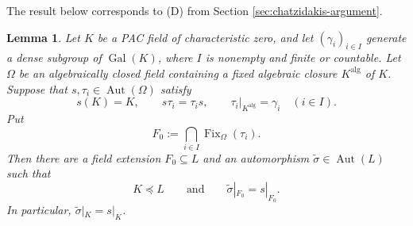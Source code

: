 \documentclass[11pt,a4paper]{amsart}
\newtheorem{lemma}[theorem]{Lemma}
\theoremstyle{definition}
\newcommand{\alg}{\mathrm{alg}}
\DeclareMathOperator{\Gal}{Gal}
\DeclareMathOperator{\Aut}{Aut}
\DeclareMathOperator{\Fix}{Fix}
\begin{document}
The result below corresponds to (D) from Section \ref{sec:chatzidakis-argument}.
\begin{lemma}\label{b:lem:completion}
Let $K$ be a PAC field of characteristic zero, and let
$(\gamma_i)_{i\in I}$ generate a dense subgroup of $\Gal(K)$,
where $I$ is nonempty and finite or countable. Let $\Omega$
be an algebraically closed field containing a fixed algebraic
closure $K^{\alg}$ of $K$. Suppose that $s,\tau_i\in\Aut(\Omega)$
satisfy
\[
s(K)=K,\qquad s\tau_i=\tau_i s,\qquad
\tau_i|_{K^{\alg}}=\gamma_i
\quad(i\in I).
\]
Put
\[
F_0:=\bigcap_{i\in I}\Fix_\Omega(\tau_i).
\]
Then there are a field extension $F_0\subseteq L$ and an
automorphism $\widetilde\sigma\in\Aut(L)$ such that
\[
K\preccurlyeq L
\qquad\text{and}\qquad
\widetilde\sigma|_{F_0}=s|_{F_0}.
\]
In particular, $\widetilde\sigma|_K=s|_K$.
\end{lemma}
\end{document}
